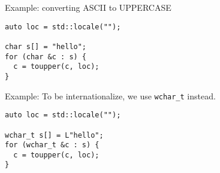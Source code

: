 Example: converting ASCII to UPPERCASE
\begin{verbatim}
auto loc = std::locale("");

char s[] = "hello";
for (char &c : s) {
  c = toupper(c, loc);
}
\end{verbatim}

Example: To be internationalize, we use \verb!wchar_t! instead.
\begin{verbatim}
auto loc = std::locale("");

wchar_t s[] = L"hello";
for (wchar_t &c : s) {
  c = toupper(c, loc);
}
\end{verbatim}
